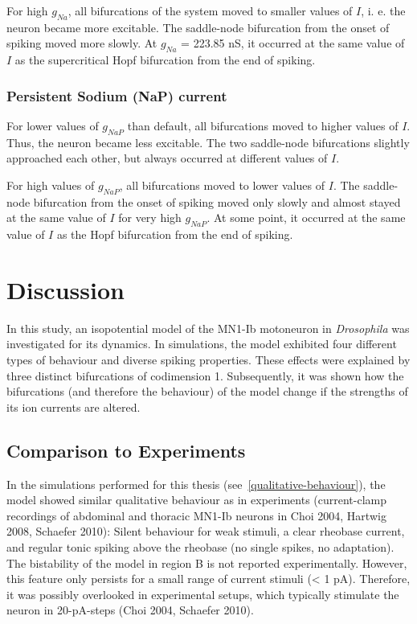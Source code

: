 \documentclass[12pt,a4paper,]{report}
\begin{document}
For high $g_{Na}$, all bifurcations of the system moved to smaller
values of $I$, i. e. the neuron became more excitable. The saddle-node
bifurcation from the onset of spiking moved more slowly. At $g_{Na}$ =
223.85 nS, it occurred at the same value of $I$ as the supercritical
Hopf bifurcation from the end of spiking.

\subsection{Persistent Sodium (NaP)
current}\label{persistent-sodium-nap-current}

For lower values of $g_{NaP}$ than default, all bifurcations moved to
higher values of $I$. Thus, the neuron became less excitable. The two
saddle-node bifurcations slightly approached each other, but always
occurred at different values of $I$.

For high values of $g_{NaP}$, all bifurcations moved to lower values of
$I$. The saddle-node bifurcation from the onset of spiking moved only
slowly and almost stayed at the same value of $I$ for very high
$g_{NaP}$. At some point, it occurred at the same value of $I$ as the
Hopf bifurcation from the end of spiking.

\chapter{Discussion}\label{discussion}

In this study, an isopotential model of the MN1-Ib motoneuron in
\emph{Drosophila} was investigated for its dynamics. In simulations, the
model exhibited four different types of behaviour and diverse spiking
properties. These effects were explained by three distinct bifurcations
of codimension 1. Subsequently, it was shown how the bifurcations (and
therefore the behaviour) of the model change if the strengths of its ion
currents are altered.

\section{Comparison to Experiments}\label{comparison-to-experiments}

In the simulations performed for this thesis
(see~\ref{qualitative-behaviour}), the model showed similar qualitative
behaviour as in experiments (current-clamp recordings of abdominal and
thoracic MN1-Ib neurons in Choi 2004, Hartwig 2008, Schaefer 2010):
Silent behaviour for weak stimuli, a clear rheobase current, and regular
tonic spiking above the rheobase (no single spikes, no adaptation). The
bistability of the model in region B is not reported experimentally.
However, this feature only persists for a small range of current stimuli
(\textless{} 1 pA). Therefore, it was possibly overlooked in
experimental setups, which typically stimulate the neuron in 20-pA-steps
(Choi 2004, Schaefer 2010).
\end{document}

